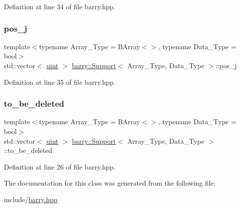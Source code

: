 Definition at line 34 of file barry.\+hpp.

\mbox{\label{classbarry_1_1_support_a5aeba4c4447efe7523abfb1cef864e63}} 
\subsubsection{\texorpdfstring{pos\+\_\+j}{pos\_j}}
{\footnotesize\ttfamily template$<$typename Array\+\_\+\+Type  = B\+Array$<$$>$, typename Data\+\_\+\+Type  = bool$>$ \\
std\+::vector$<$ \hyperlink{namespacebarry_a11dfc53ddb4672278319aa04f1e09a6c}{uint} $>$ \hyperlink{classbarry_1_1_support}{barry\+::\+Support}$<$ Array\+\_\+\+Type, Data\+\_\+\+Type $>$\+::pos\+\_\+j}



Definition at line 35 of file barry.\+hpp.

\mbox{\label{classbarry_1_1_support_a026b2c5eecc7404e5715f8a90a594ea1}} 
\subsubsection{\texorpdfstring{to\+\_\+be\+\_\+deleted}{to\_be\_deleted}}
{\footnotesize\ttfamily template$<$typename Array\+\_\+\+Type  = B\+Array$<$$>$, typename Data\+\_\+\+Type  = bool$>$ \\
std\+::vector$<$ \hyperlink{namespacebarry_a11dfc53ddb4672278319aa04f1e09a6c}{uint} $>$ \hyperlink{classbarry_1_1_support}{barry\+::\+Support}$<$ Array\+\_\+\+Type, Data\+\_\+\+Type $>$\+::to\+\_\+be\+\_\+deleted}



Definition at line 26 of file barry.\+hpp.



The documentation for this class was generated from the following file\+:\begin{DoxyCompactItemize}
\item 
include/\hyperlink{barry_8hpp}{barry.\+hpp}\end{DoxyCompactItemize}
